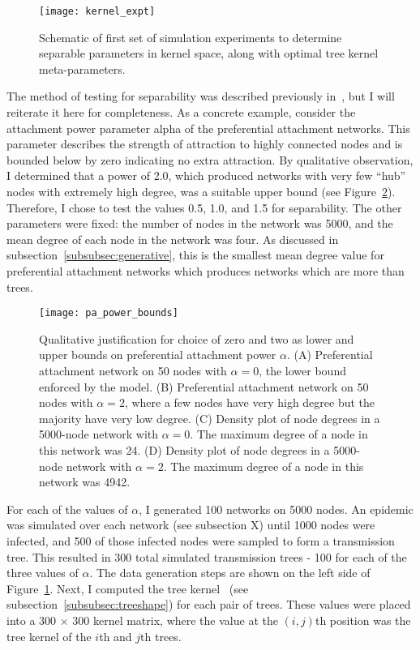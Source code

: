 \begin{figure}[ht]
  \centering
  \label{fig:kernelexpt}
  \texttt{[image: kernel\_expt]}
  \caption[Schematic of first set of simulation experiments]{
    Schematic of first set of simulation experiments to determine separable
    parameters in kernel space, along with optimal tree kernel meta-parameters.
  }
\end{figure}

The method of testing for separability was described previously
in~\autocite{poon2015phylodynamic}, but I will reiterate it here for
completeness. As a concrete example, consider the attachment power parameter
\gls{alpha} of the preferential attachment networks. This parameter describes the
strength of attraction to highly connected nodes and is bounded below by zero
indicating no extra attraction. By qualitative observation, I determined that a
power of 2.0, which produced networks with very few ``hub'' nodes with
extremely high degree, was a suitable upper bound (see
Figure~\ref{fig:pabounds}). Therefore, I chose to test the values 0.5, 1.0, and
1.5 for separability. The other parameters were fixed: the number of nodes in
the network was 5000, and the mean degree of each node in the network was four.
As discussed in subsection~\ref{subsubsec:generative}, this is the smallest
mean degree value for preferential attachment networks which produces networks
which are more than trees. 

\begin{figure}[ht]
  \centering
  \label{fig:pabounds}
  \texttt{[image: pa\_power\_bounds]}
  \caption[Upper and lower bounds on preferential attachment power]{
    Qualitative justification for choice of zero and two as lower and upper
    bounds on preferential attachment power $\alpha$. (A) Preferential
    attachment network on 50 nodes with $\alpha = 0$, the lower bound enforced
    by the model. (B) Preferential attachment network on 50 nodes with $\alpha
    = 2$, where a few nodes have very high degree but the majority have very
    low degree. (C) Density plot of node degrees in a 5000-node network with
    $\alpha = 0$. The maximum degree of a node in this network was 24. (D)
    Density plot of node degrees in a 5000-node network with $\alpha = 2$. The
    maximum degree of a node in this network was 4942. 
  }
\end{figure}

For each of the values of $\alpha$, I generated 100 networks on 5000 nodes. An
epidemic was simulated over each network (see subsection X) until 1000 nodes
were infected, and 500 of those infected nodes were sampled to form a
transmission tree. This resulted in 300 total simulated transmission trees -
100 for each of the three values of $\alpha$. The data generation steps are
shown on the left side of Figure~\ref{fig:kernelexpt}. Next, I computed the
tree kernel~\autocite{poon2013mapping} (see
subsection~\ref{subsubsec:treeshape}) for each pair of trees. These values were
placed into a 300 $\times$ 300 kernel matrix, where the value at the $(i, j)$th
position was the tree kernel of the $i$th and $j$th trees. 


